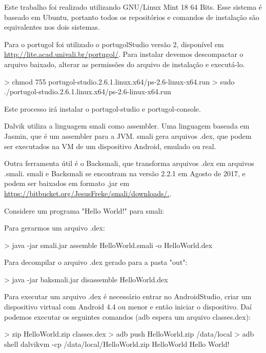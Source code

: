 \documentclass[12pt,a4paper,twoside]{report}
\begin{document}
Este trabalho foi realizado utilizando GNU/Linux Mint 18 64 Bits.
Esse sistema é baseado em Ubuntu, portanto todos os repositórios e comandos
de instalação são equivalentes nos dois sistemas.

Para o portugol foi utilizado o portugolStudio versão 2, disponível em
\url{http://lite.acad.univali.br/portugol/}. Para instalar devemos descompactar
o arquivo baixado, alterar as permissões do arquivo de instalação e executá-lo.

\begin{terminal}
> chmod 755 portugol-studio.2.6.1.linux.x64/ps-2.6-linux-x64.run
> sudo ./portugol-studio.2.6.1.linux.x64/ps-2.6-linux-x64.run
\end{terminal}

Este processo irá instalar o portugol-studio e portugol-console.

Dalvik utiliza a linguagem smali como assembler. Uma linguagem baseada
em Jasmin, que é um assembler para a JVM. smali gera arquivos .dex, que
podem ser executados na VM de um dispositivo Android, emulado ou real.

Outra ferramenta útil é o Backsmali, que transforma arquivos .dex em
arquivos .smali. smali e Backsmali se encontram na versão 2.2.1 em Agosto de 2017,
e podem ser baixados em formato .jar em \url{https://bitbucket.org/JesusFreke/smali/downloads/.}.

Considere um programa "Hello World!" para smali:



Para gerarmos um arquivo .dex:
\begin{terminal}
> java -jar smali.jar assemble HelloWorld.smali -o HelloWorld.dex
\end{terminal}

Para decompilar o arquivo .dex gerado para a pasta "out":
\begin{terminal}
> java -jar baksmali.jar disassemble HelloWorld.dex
\end{terminal}

Para executar um arquivo .dex é necessário entrar no AndroidStudio,
criar um dispositivo virtual com Android 4.4 ou menor e então iniciar o dispositivo.
Daí podemos executar os seguintes comandos (adb espera um arquivo classes.dex):
\begin{terminal}
> zip HelloWorld.zip classes.dex
> adb push HelloWorld.zip /data/local
> adb shell dalvikvm -cp /data/local/HelloWorld.zip HelloWorld
Hello World!
\end{terminal}
\end{document}
